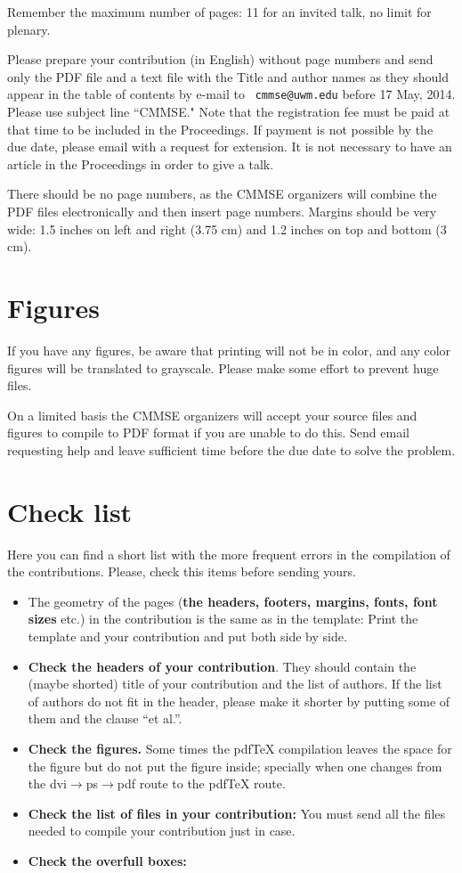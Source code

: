 \documentclass{cmmse2014}
\begin{document}
Remember the maximum number of pages: 11 for an invited talk, no
limit for plenary.

Please prepare your contribution (in English) without page numbers
and send only the PDF file and a text file with the Title and author
names as they should appear in the table of contents by
 e-mail to {\tt
cmmse@uwm.edu} before 17 May, 2014. Please use
subject line ``CMMSE."  Note that the registration fee must be paid
at that time to be included in the Proceedings. If payment is not
possible by the due date, please email with a request for extension.
It is not necessary to have an article in the Proceedings in order
to give a talk.


There should be no page numbers, as the CMMSE organizers will
combine the PDF files electronically and then insert page numbers.
Margins should be very wide: 1.5 inches on left and right (3.75 cm)  and 1.2 inches on top and bottom (3 cm).


\newpage

\section{Figures}

If you have any figures, be aware that printing will not be in
color, and any color figures will be translated to grayscale. Please
make some effort to prevent huge files.  

On a limited
basis the CMMSE organizers will accept your source files and figures
to compile to PDF format if you are unable to do this.  Send email
requesting help and leave sufficient time before the due date to
solve the problem.

\section{Check list}
Here you can find a short list with the more frequent errors in the compilation of the contributions.
Please, check this items before sending yours.
\begin{itemize}
\item The geometry of the pages ({\bf the headers, footers, margins, fonts, font sizes} etc.) in the contribution is the same as in the template: Print the template and your contribution and put both side by side.
\item {\bf Check the headers of your contribution}. They should contain the (maybe shorted) title of your contribution and the list of authors. If the list of authors do not fit in the header, please make it shorter by putting some of them and the clause ``et al.''.
\item  {\bf Check the figures.} Some times the pdf\TeX{}  compilation leaves the space for the figure but do not put the figure inside; specially when one changes from the dvi$\to$ps$\to$pdf route to the pdf\TeX{}  route.
\item {\bf Check the list of files in your contribution:} You must send all the files needed to compile your contribution just in case. 
\item {\bf Check the overfull boxes:} 
\end{itemize}
\newpage
 
\end{document}
